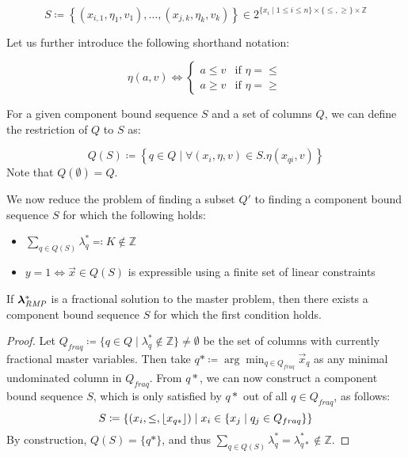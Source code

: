\begin{equation}
S \coloneqq \left\{ \left( x_{i,1}, \eta_1, v_1 \right), \dots, \left( x_{j,k}, \eta_k, v_k \right) \right\} \in 2^{\{x_i \mid 1 \leq i \leq n\} \times \{\leq, \geq\} \times \mathbb{Z}}
\end{equation}

Let us further introduce the following shorthand notation:

\begin{equation}
\eta(a, v) \Leftrightarrow
\begin{cases}
a \leq v & \text{if } \eta = \leq \\
a \geq v & \text{if } \eta = \geq
\end{cases}
\end{equation}

For a given component bound sequence $S$ and a set of columns $Q$, we can define the restriction of $Q$ to $S$ as:

\begin{equation}
Q(S) \coloneqq \left\{ q \in Q \mid \forall \left( x_i, \eta, v \right) \in S. \eta(x_{qi}, v) \right\}
\end{equation}
Note that $Q(\emptyset) = Q$.

We now reduce the problem of finding a subset $Q'$ to finding a component bound sequence $S$ for which the following holds:

\begin{itemize}
\item $\sum_{q \in Q(S)} \lambda_q^* \eqqcolon K \not\in \mathbb{Z}$
\item $y = 1 \Leftrightarrow \vec{x} \in Q(S)$ is expressible using a finite set of linear constraints
\end{itemize}

\begin{proposition}
If ${\bm{\lambda}}^*_{\textit{RMP}}{}$ is a fractional solution to the master problem, then there exists a component bound sequence $S$ for which the first condition holds.
\end{proposition}

\begin{proof}\label{pr:cg_bp_bp}
Let $Q_{fraq} \coloneqq \{ q \in Q \mid \lambda_q^* \not\in \mathbb{Z} \} \neq \emptyset$ be the set of columns with currently fractional master variables. Then take $q* \coloneqq \arg\min_{q \in Q_{fraq}} \vec{x}_q$ as any minimal undominated column in $Q_{fraq}$.
From $q*$, we can now construct a component bound sequence $S$, which is only satisfied by $q*$ out of all $q \in Q_{fraq}$, as follows:
\begin{equation}
S \coloneqq \left\{ \left( x_i, \leq, \lfloor x_{q*}\rfloor \right) \mid x_i \in \{x_j \mid q_j \in Q_{fraq}\} \right\}
\end{equation}
By construction, $Q(S) = \{q*\}$, and thus $\sum_{q \in Q(S)} \lambda_q^* = \lambda_{q*}^* \not\in \mathbb{Z}$.
\end{proof}

